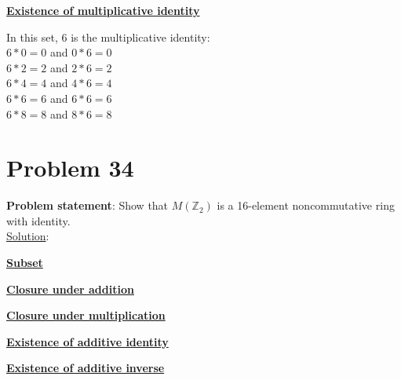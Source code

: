 \documentclass{article} %
\begin{document}
\begin{addmargin}[1em]{0em}
\underline{\textbf{Existence of multiplicative identity}}
\begin{addmargin}[1em]{0em}
In this set, $6$ is the multiplicative identity:
\\ $ 6 * 0 = 0$ and $0 * 6 = 0$
\\ $ 6 * 2 = 2$ and $2 * 6 = 2$
\\ $ 6 * 4 = 4$ and $4 * 6 = 4$
\\ $ 6 * 6 = 6$ and $6 * 6 = 6$
\\ $ 6 * 8 = 8$ and $8 * 6 = 8$
\end{addmargin}

\end{addmargin}

\newpage

\section*{Problem 34}


\textbf{Problem statement}: Show that $M(\mathbb{Z}_2)$ is a 16-element noncommutative ring with identity.
\\

\underline{Solution}:
\begin{addmargin}[1em]{0em}

\underline{\textbf{Subset}}
\begin{addmargin}[1em]{0em}
\end{addmargin} 

\underline{\textbf{Closure under addition}}
\begin{addmargin}[1em]{0em}
\end{addmargin}

\underline{\textbf{Closure under multiplication}}
\begin{addmargin}[1em]{0em}
\end{addmargin}

\underline{\textbf{Existence of additive identity}}
\begin{addmargin}[1em]{0em}
\end{addmargin}

\underline{\textbf{Existence of additive inverse}}
\begin{addmargin}[1em]{0em}
\end{addmargin}

\end{addmargin}

\newpage
\end{document}
